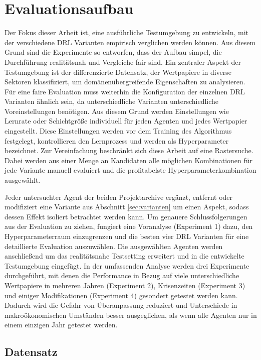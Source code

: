 \chapter{Evaluationsaufbau}
\label{ch:evaluationsaufbau}

Der Fokus dieser Arbeit ist, eine ausführliche Testumgebung zu entwickeln, mit der verschiedene \acs{DRL} Varianten empirisch verglichen werden können. Aus diesem Grund sind die Experimente so entworfen, dass der Aufbau simpel, die Durchführung realitätsnah und Vergleiche fair sind.
Ein zentraler Aspekt der Testumgebung ist der differenzierte Datensatz, der Wertpapiere in diverse Sektoren klassifiziert, um domänenübergreifende Eigenschaften zu analysieren.
Für eine faire Evaluation muss weiterhin die Konfiguration der einzelnen \acs{DRL} Varianten ähnlich sein, da unterschiedliche Varianten unterschiedliche Voreinstellungen benötigen. Aus diesem Grund werden Einstellungen wie Lernrate oder Schichtgröße individuell für jeden Agenten und jedes Wertpapier eingestellt. 
Diese Einstellungen werden vor dem Training des Algorithmus festgelegt, kontrollieren den Lernprozess und werden als Hyperparameter bezeichnet.
Zur Vereinfachung beschränkt sich diese Arbeit auf eine Rastersuche. Dabei werden aus einer Menge an Kandidaten alle möglichen Kombinationen für jede Variante manuell evaluiert und die profitabelste Hyperparameterkombination ausgewählt.

Jeder untersuchter Agent der beiden Projektarchive \parencite{repo1,repo2} ergänzt, entfernt oder modifiziert eine Variante aus Abschnitt \ref{sec:varianten} um einen Aspekt, sodass dessen Effekt isoliert betrachtet werden kann.
Um genauere Schlussfolgerungen aus der Evaluation zu ziehen, fungiert eine Voranalyse (Experiment 1) dazu, den Hyperparameterraum einzugrenzen und die besten vier \acs{DRL} Varianten für eine detaillierte Evaluation auszuwählen.
Die ausgewählten Agenten werden anschließend um das realitätsnahe Testsetting erweitert und in die entwickelte Testumgebung eingefügt. 
In der umfassenden Analyse werden drei Experimente durchgeführt, mit denen die Performance in Bezug auf viele unterschiedliche Wertpapiere in mehreren Jahren (Experiment 2), Krisenzeiten (Experiment 3) und einiger Modifikationen (Experiment 4) gesondert getestet werden kann.
Dadurch wird die Gefahr von Überanpassung reduziert und Unterschiede in makroökonomischen Umständen besser ausgeglichen, als wenn alle Agenten nur in einem einzigen Jahr getestet werden.

\section{Datensatz}
\label{sec:datensatz}


